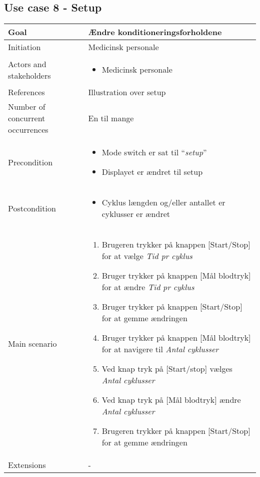 	\subsection{Use case 8 - Setup}
		\begin{center}
			\begin{tabular}{ | p{} | p{}| } 
				\hline
				Goal& Ændre konditioneringsforholdene \\ 
				\hline
				Initiation &  Medicinsk personale\\
				\hline
				Actors and stakeholders & 
				\begin{itemize}
					\item Medicinsk personale 
				\end{itemize} \\ 
				\hline
				References & Illustration over setup \\ 
				\hline
				Number of concurrent occurrences & En til mange \\ 
				\hline	
				Precondition & 
				\begin{itemize}
					\item Mode switch er sat til “\textit{setup}” 
					\item Displayet er ændret til setup
 				\end{itemize} \\ 
				\hline
				Postcondition & 
				\begin{itemize}
					\item Cyklus længden og/eller antallet er cyklusser er ændret
				\end{itemize} \\ 
				\hline
				Main scenario & \begin{enumerate}
					\setlength\itemsep{0cm} %
					\item Brugeren trykker på knappen [Start/Stop] for at vælge \textit{Tid pr cyklus}
					\item Bruger trykker på knappen [Mål blodtryk] for at ændre \textit{Tid pr cyklus}
					\item Bruger trykker på knappen [Start/Stop] for at gemme ændringen
					\item Bruger trykker på knappen [Mål blodtryk] for at navigere til \textit{Antal cyklusser}
					\item Ved knap tryk på [Start/stop] vælges \textit{Antal cyklusser}
					\item Ved knap tryk på [Mål blodtryk] ændre \textit{Antal cyklusser}
					\item Brugeren trykker på knappen [Start/Stop] for at gemme ændringen
				\end{enumerate} \\ 
				\hline
				Extensions & -  \\ 
				\hline
			\end{tabular}
		\end{center}
			\pagebreak
